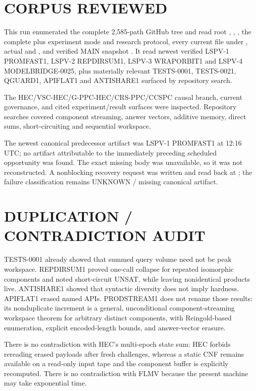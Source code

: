 \documentclass[11pt]{article}
\begin{document}
\section{CORPUS REVIEWED}

This run enumerated the complete 2,585-path GitHub tree and read root
, , , the complete
 plus experiment mode and research
protocol, every current file under , actual  and
, and verified MAIN snapshot
.  It read newest
verified LSPV-1 PROMFAST1, LSPV-2 REPDIRSUM1, LSPV-3 WRAPORBIT1 and LSPV-4
MODELBRIDGE-0025, plus materially relevant TESTS-0001, TESTS-0021, QGUARD1,
APIFLAT1 and ANTISHARE1 surfaced by repository search.

The HEC/VSC-HEC/G-PPC-HEC/CRS-PPC/CCSPC causal branch, current governance,
and cited experiment/result surfaces were inspected.  Repository searches
covered component streaming, answer vectors, additive memory, direct sums,
short-circuiting and sequential workspace.

The newest canonical predecessor artifact was LSPV-1 PROMFAST1 at 12:16 UTC;
no artifact attributable to the immediately preceding scheduled opportunity
was found.  The exact missing body was unavailable, so it was not
reconstructed.  A nonblocking recovery request was written and read back at
; the failure
classification remains UNKNOWN / missing canonical artifact.

\section{DUPLICATION / CONTRADICTION AUDIT}

TESTS-0001 already showed that summed query volume need not be peak workspace.
REPDIRSUM1 proved one-call collapse for repeated isomorphic components and
noted short-circuit UNSAT, while leaving nonidentical products live.
ANTISHARE1 showed that syntactic diversity does not imply hardness.
APIFLAT1 erased named APIs.  PRODSTREAM1 does not rename those results: its
nonduplicate increment is a general, unconditional component-streaming
workspace theorem for arbitrary distinct components, with Reingold-based
enumeration, explicit encoded-length bounds, and answer-vector erasure.

There is no contradiction with HEC's multi-epoch state sum: HEC forbids
rereading erased payloads after fresh challenges, whereas a static CNF remains
available on a read-only input tape and the component buffer is explicitly
recomputed.  There is no contradiction with FLMV because the present machine
may take exponential time.
\end{document}
